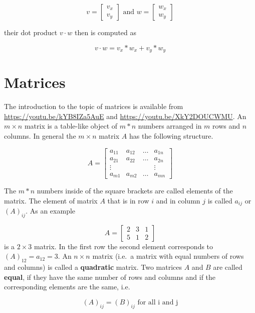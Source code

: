 \documentclass[
]{book}
\begin{document}
\[v = \left[\begin{array}{c} v_x \\ v_y \end{array}\right] \text{ and } w= \left[\begin{array}{c} w_x \\ w_y \end{array}\right]\]

their dot product \(v \cdot w\) then is computed as

\[v \cdot w = v_x * w_x + v_y * w_y\]

\hypertarget{intro-linalg-matrices}{%
\section{Matrices}\label{intro-linalg-matrices}}

The introduction to the topic of matrices is available from \url{https://youtu.be/kYB8IZa5AuE} and \url{https://youtu.be/XkY2DOUCWMU}. An \(m \times n\) matrix is a table-like object of \(m*n\) numbers arranged in \(m\) rows and \(n\) columns. In general the \(m \times n\) matrix \(A\) has the following structure.

\[
A = \left[
\begin{array}{cccc}
a_{11}  &  a_{12} &  \ldots  &  a_{1n} \\
a_{21}  &  a_{22} &  \ldots  &  a_{2n} \\
\vdots  &         &          &  \vdots \\
a_{m1}  &  a_{m2} &  \ldots  &  a_{mn}
\end{array}
\right]
\]

The \(m*n\) numbers inside of the square brackets are called elements of the matrix. The element of matrix \(A\) that is in row \(i\) and in column \(j\) is called \(a_{ij}\) or \((A)_{ij}\). As an example

\[
A =  \left[
\begin{array}{ccc}
2  &  3  &  1  \\
5  &  1  &  2
\end{array}
\right]
\]
is a \(2 \times 3\) matrix. In the first row the second element corresponds to \((A)_{12} = a_{12} = 3\). An \(n\times n\) matrix (i.e.~a matrix with equal numbers of rows and columns) is called a \textbf{quadratic} matrix. Two matrices \(A\) and \(B\) are called \textbf{equal}, if they have the same number of rows and columns and if the corresponding elements are the same, i.e.

\[
(A)_{ij} = (B)_{ij} \text{ for all i and j}
\]
\end{document}
